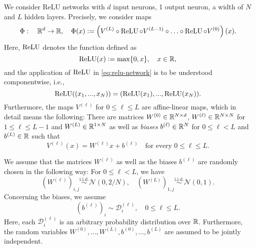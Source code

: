 \begin{assumption} \label{assum:1}
We consider ReLU networks with $d$ input neurons, 1 output neuron, a width of $N$ and $L$ hidden layers.
Precisely, we consider maps 
\begin{equation} \label{eq:relu-network}
  \Phi: \quad \mathbb{R}^d \to \mathbb{R},
  \quad
  \Phi(x)
  \mathrel{\mathop:}= \left( V^{(L)} \circ \operatorname{ReLU} \circ V^{(L-1)} \circ  \hdots \circ \operatorname{ReLU} \circ V^{(0)}\right) (x).
\end{equation}
Here, $\operatorname{ReLU}$ denotes the function defined as 
\begin{equation*}
  \operatorname{ReLU} (x) \mathrel{\mathop:}= \max \{0,x\}, \quad x \in \mathbb{R},
\end{equation*} 
and the application of $\operatorname{ReLU}$ in \eqref{eq:relu-network} is to be understood componentwise, i.e., 
\begin{equation*}
  \operatorname{ReLU} ((x_1, ..., x_N)) = (\operatorname{ReLU} (x_1),..., \operatorname{ReLU}(x_N)). 
\end{equation*}
Furthermore, the maps $V^{(\ell)}$ for $0 \leq \ell \leq L$ are affine-linear maps,
which in detail means the following:
There are matrices $W^{(0)} \in \mathbb{R}^{N \times d}$, $W^{(\ell)} \in \mathbb{R}^{N \times N}$
for $1 \leq \ell \leq L-1$ and $W^{(L)} \in \mathbb{R}^{1 \times N}$
as well as \emph{biases} $b^{(\ell)} \in \mathbb{R}^N$ for $0 \leq \ell < L$ and $b^{(L)} \in \mathbb{R}$ such that
\begin{equation*}
  V^{(\ell)} (x) = W^{(\ell)}x + b^{(\ell)}
  \quad \text{for every } 0 \leq \ell \leq L.
\end{equation*}

We assume that the matrices $W^{(\ell)}$ as well as the biases $b^{(\ell)}$ are randomly
chosen in the following way:
For $0 \leq \ell < L$, we have 
\begin{equation*}
  \left( W^{(\ell)}\right)_{i,j} \overset{\mathrm{i.i.d.}}{\sim} \mathcal{N}(0,2/N),
  \quad
  \left( W^{(L)}\right)_{1,j} \overset{\mathrm{i.i.d.}}{\sim} \mathcal{N}(0,1).
\end{equation*}
Concerning the biases, we assume
\begin{equation*}
  \left( b^{(\ell)}\right)_i \sim \mathcal{D}^{(\ell)}_i,
  \quad 0 \leq \ell \leq L.
\end{equation*}
Here, each $\mathcal{D}^{(\ell)}_i$ is an arbitrary probability distribution over $\mathbb{R}$.
Furthermore, the random variables $W^{(0)}, ..., W^{(L)}, b^{(0)}, ..., b^{(L)}$ are assumed to be jointly independent.
\end{assumption}

